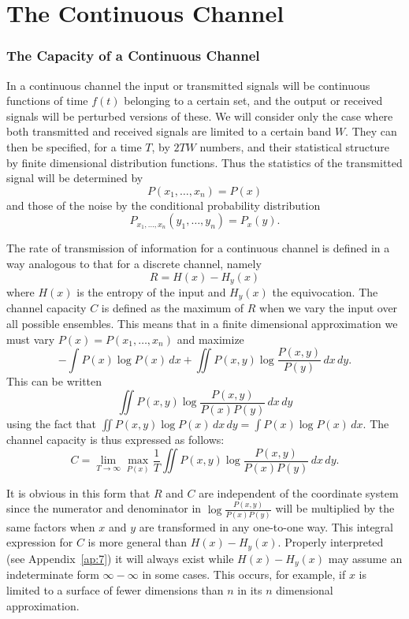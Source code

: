 \part{The Continuous Channel}
\section{The Capacity of a Continuous Channel}

In a continuous channel the input or transmitted signals will be continuous
functions of time $f(t)$ belonging to a certain set, and the output or
received signals will be perturbed versions of these.  We will consider
only the case where both transmitted and received signals are limited to a
certain band $W$.  They can then be specified, for a time $T$, by $2 T W$
numbers, and their statistical structure by finite dimensional
distribution functions.  Thus the statistics of the transmitted signal will
be determined by
$$
P(x_1,\dots,x_n)=P(x)
$$
and those of the noise by the conditional probability distribution
$$
P_{x_1,\dots,x_n}(y_1,\dots,y_n)=P_x(y).
$$

The rate of transmission of information for a continuous channel is defined
in a way analogous to that for a discrete channel, namely
$$
R=H(x)-H_y(x)
$$
where $H(x)$ is the entropy of the input and $H_y(x)$ the equivocation.
The channel capacity $C$ is defined as the maximum of $R$ when we vary the
input over all possible ensembles.  This means that in a finite dimensional
approximation we must vary $P(x)=P(x_1,\dots,x_n)$ and maximize
$$
-\int P(x)\log P(x)\,dx+\iint P(x,y)\log\frac{P(x,y)}{P(y)}\,dx\,dy.
$$
This can be written
$$
\iint P(x,y)\log\frac{P(x,y)}{P(x)P(y)}\,dx\,dy
$$
using the fact that $\displaystyle\iint P(x,y)\log P(x)\,dx\,dy=\int
P(x)\log P(x)\,dx$.  The channel capacity is thus expressed as follows:
$$
C=\lim_{T\to\infty}\max_{P(x)}\frac 1 T
	\iint P(x,y)\log\frac{P(x,y)}{P(x)P(y)}\,dx\,dy.
$$

It is obvious in this form that $R$ and $C$ are independent of the
coordinate system since the numerator and denominator in
$\displaystyle\log\frac{P(x,y)}{P(x)P(y)}$ will be multiplied by the same
factors when $x$ and $y$  are transformed in any one-to-one way.  This
integral expression for $C$ is more general than $H(x)-H_y(x)$.  Properly
interpreted (see Appendix~\ref{ap:7}) it will always exist while
$H(x)-H_y(x)$ may assume an indeterminate form $\infty-\infty$ in some
cases.  This occurs, for example, if $x$ is limited to a surface of fewer
dimensions than $n$ in its $n$ dimensional approximation.

